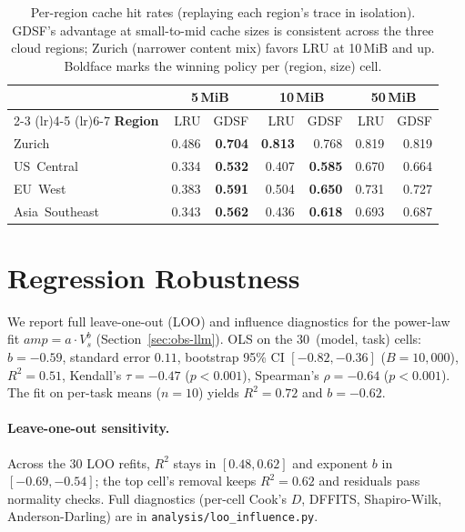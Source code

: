 \documentclass[10pt,sigconf,letterpaper,anonymous,nonacm]{acmart}
\begin{document}
\begin{table}[t]
\centering
\small
\caption{Per-region cache hit rates (replaying each region's trace in
  isolation).  GDSF's advantage at small-to-mid cache sizes is
  consistent across the three cloud regions; Zurich (narrower content
  mix) favors LRU at 10\,MiB and up.  Boldface marks the winning
  policy per (region, size) cell.}
\label{tab:replay-region}
\begin{tabular}{@{}lrrrrrr@{}}
\toprule
& \multicolumn{2}{c}{\textbf{5\,MiB}} & \multicolumn{2}{c}{\textbf{10\,MiB}} & \multicolumn{2}{c}{\textbf{50\,MiB}} \\
\cmidrule(lr){2-3} \cmidrule(lr){4-5} \cmidrule(lr){6-7}
\textbf{Region} & LRU & GDSF & LRU & GDSF & LRU & GDSF \\
\midrule
Zurich        & 0.486 & \textbf{0.704} & \textbf{0.813} & 0.768 & 0.819 & 0.819 \\
US~Central    & 0.334 & \textbf{0.532} & 0.407 & \textbf{0.585} & 0.670 & 0.664 \\
EU~West       & 0.383 & \textbf{0.591} & 0.504 & \textbf{0.650} & 0.731 & 0.727 \\
Asia~Southeast & 0.343 & \textbf{0.562} & 0.436 & \textbf{0.618} & 0.693 & 0.687 \\
\bottomrule
\end{tabular}
\end{table}

\section{Regression Robustness}
\label{sec:appendix-loo}

We report full leave-one-out (LOO) and influence diagnostics for the
power-law fit $\textit{amp} = a \cdot V_s^{b}$ (Section~\ref{sec:obs-llm}).
OLS on the 30~(model, task) cells: $b = -0.59$, standard error $0.11$,
bootstrap 95\% CI $[-0.82, -0.36]$ ($B=10{,}000$), $R^2 = 0.51$,
Kendall's $\tau = -0.47$ ($p < 0.001$), Spearman's $\rho = -0.64$
($p < 0.001$).  The fit on per-task means ($n=10$) yields
$R^2 = 0.72$ and $b = -0.62$.

\paragraph{Leave-one-out sensitivity.} Across the 30 LOO refits,
$R^2$ stays in $[0.48, 0.62]$ and exponent $b$ in $[-0.69, -0.54]$;
the top cell's removal keeps $R^2 = 0.62$ and residuals pass normality
checks.  Full diagnostics (per-cell Cook's $D$, DFFITS, Shapiro-Wilk,
Anderson-Darling) are in \texttt{analysis/loo\_influence.py}.
\end{document}
